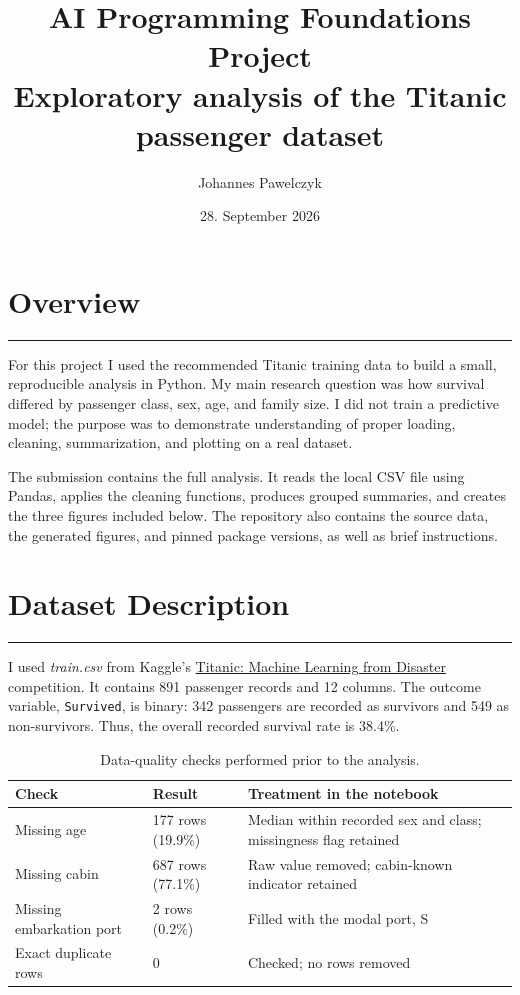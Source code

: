 \documentclass[11pt,a4paper]{article}
\title{\textbf{AI Programming Foundations Project}\\[0.4em]
\large Exploratory analysis of the Titanic passenger dataset}
\author{Johannes Pawelczyk}
\date{28. September 2026}
\newcommand{\reportsection}[1]{%
  \section{#1}
  \vspace{-0.4em}
  \textcolor{rulegray}{\rule{\textwidth}{0.5pt}}
  \vspace{0.2em}
}
\begin{document}
\maketitle
\thispagestyle{fancy}

\reportsection{Overview}

For this project I used the recommended Titanic training data to build a small,
reproducible analysis in Python. My main research question was how survival differed by
passenger class, sex, age, and family size. I did not train a predictive model; the
purpose was to demonstrate understanding of proper loading, cleaning, summarization,
and plotting on a real dataset.

The submission contains the full analysis. It reads the local CSV file using
Pandas, applies the cleaning functions, produces grouped summaries, and creates
the three figures included below. The repository also contains the source data,
the generated figures, and pinned package versions, as well as brief instructions.

\reportsection{Dataset Description}

I used \emph{train.csv} from Kaggle's
\href{https://www.kaggle.com/c/titanic/data}{Titanic: Machine Learning from
Disaster} competition. It contains 891 passenger records and 12 columns.
The outcome variable, \texttt{Survived}, is binary: 342 passengers are
recorded as survivors and 549 as non-survivors. Thus, the overall recorded survival
rate is 38.4\%.

\begin{table}[H]
  \centering
  \small
  \begin{tabular}{@{}p{}p{}p{}@{}}
    \toprule
    Check & Result & Treatment in the notebook \\
    \midrule
    Missing age & 177 rows (19.9\%) & Median within recorded sex and class; missingness flag retained \\
    Missing cabin & 687 rows (77.1\%) & Raw value removed; cabin-known indicator retained \\
    Missing embarkation port & 2 rows (0.2\%) & Filled with the modal port, S \\
    Exact duplicate rows & 0 & Checked; no rows removed \\
    \bottomrule
  \end{tabular}
  \caption{Data-quality checks performed prior to the analysis.}
  \label{tab:quality}
\end{table}
\end{document}
